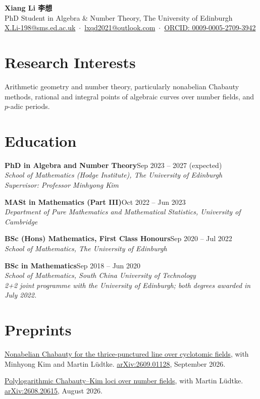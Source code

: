 \documentclass[11pt,a4paper]{article}
\newcommand{\cventry}[4]{%
  {\textbf{#1}\hfill #2\\[1pt]\itshape #3\hfill {\small #4}\par}\vspace{6pt}}
\begin{document}
\begin{center}
  {\LARGE\bfseries Xiang Li 李想}\\[4pt]
  PhD Student in Algebra \& Number Theory, The University of Edinburgh\\[6pt]
  \small \href{mailto:X.Li-198@sms.ed.ac.uk}{X.Li-198@sms.ed.ac.uk}
  \,$\cdot$\, \href{mailto:lxqd2021@outlook.com}{lxqd2021@outlook.com}
  \,$\cdot$\, \href{https://orcid.org/0009-0005-2709-3942}{ORCID: 0009-0005-2709-3942}
\end{center}

\vspace{-6pt}

\section*{Research Interests}
Arithmetic geometry and number theory, particularly nonabelian Chabauty methods,
rational and integral points of algebraic curves over number fields, and $p$-adic periods.

\section*{Education}
{\textbf{PhD in Algebra and Number Theory}\hfill Sep 2023 -- 2027 (expected)\\[1pt]{\itshape School of Mathematics (Hodge Institute), The University of Edinburgh}\\[1pt]{\small\itshape Supervisor: Professor Minhyong Kim}\par}\vspace{6pt}
\cventry{MASt in Mathematics (Part III)}{Oct 2022 -- Jun 2023}{Department of Pure Mathematics and Mathematical Statistics, University of Cambridge}{}
\cventry{BSc (Hons) Mathematics, First Class Honours}{Sep 2020 -- Jul 2022}{School of Mathematics, The University of Edinburgh}{}
{\textbf{BSc in Mathematics}\hfill Sep 2018 -- Jun 2020\\[1pt]{\itshape School of Mathematics, South China University of Technology}\\[1pt]{\small\itshape 2+2 joint programme with the University of Edinburgh; both degrees awarded in July 2022.}\par}\vspace{6pt}

\section*{Preprints}
\begin{cvlist}
  \item \href{https://arxiv.org/abs/2609.01128}{Nonabelian Chabauty for the thrice-punctured line over cyclotomic fields},
        with Minhyong Kim and Martin Lüdtke.
        \href{https://arxiv.org/abs/2609.01128}{arXiv:2609.01128}, September 2026.
  \item \href{https://arxiv.org/abs/2608.20615}{Polylogarithmic Chabauty--Kim loci over number fields},
        with Martin Lüdtke.
        \href{https://arxiv.org/abs/2608.20615}{arXiv:2608.20615}, August 2026.
\end{cvlist}
\end{document}
